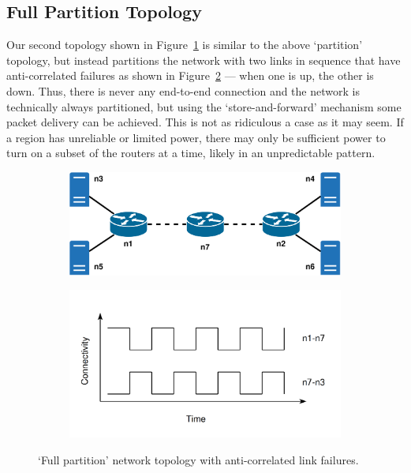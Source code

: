 \documentclass[withindex,glossary,openany]{cam-thesis}
\begin{document}
\subsection{Full Partition Topology}

Our second topology shown in Figure~\ref{fig:full_partition_topology} is similar to the above `partition' topology, but instead partitions the network with two links in sequence that have anti-correlated failures as shown in Figure~\ref{fig:full_partition_graph} --- when one is up, the other is down. Thus, there is never any end-to-end connection and the network is technically always partitioned, but using the `store-and-forward' mechanism some packet delivery can be achieved. This is not as ridiculous a case as it may seem. If a region has unreliable or limited power, there may only be sufficient power to turn on a subset of the routers at a time, likely in an unpredictable pattern.

\begin{figure}[H]
\centering
\begin{subfigure}{.65\textwidth}
  \centering
  \includegraphics[width=1\linewidth]{delay_full_partition_topology}
  \caption{}
  \label{fig:full_partition_topology}
\end{subfigure}

\begin{subfigure}{.65\textwidth}
  \centering
  \includegraphics[width=1\linewidth]{delay_full_partition_graph}
  \caption{}
  \label{fig:full_partition_graph}
\end{subfigure}
\caption{`Full partition' network topology with anti-correlated link failures.}
\label{fig:full_partition}
\end{figure}
\end{document}
